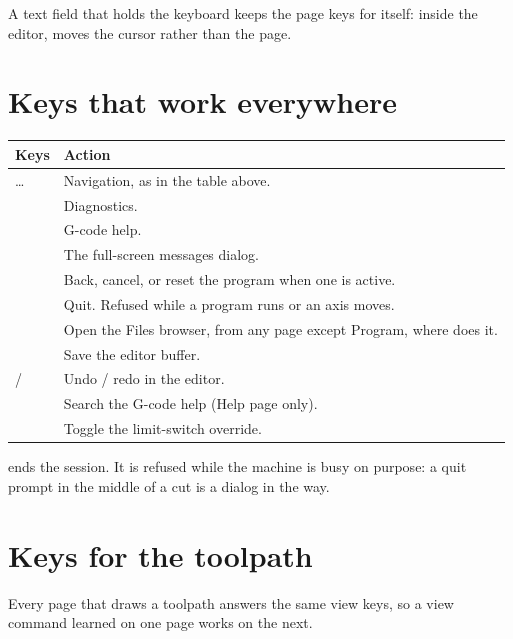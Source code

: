 A text field that holds the keyboard keeps the page keys for itself: inside the editor,
 moves the cursor rather than the page.

\section{Keys that work everywhere}

\begin{longtable}{L{4.7cm}L{8.1cm}}
  \toprule
  \textbf{Keys} & \textbf{Action} \\
  \midrule
  \endhead
   \dots {} & Navigation, as in the table above. \\
   & Diagnostics. \\
   & G-code help. \\
   & The full-screen messages dialog. \\
   & Back, cancel, or reset the program when one is active. \\
   & Quit. Refused while a program runs or an axis moves. \\
   & Open the Files browser, from any page except Program, where
         does it. \\
   & Save the editor buffer. \\
   /  & Undo / redo in the editor. \\
   & Search the G-code help (Help page only). \\
   & Toggle the limit-switch override. \\
  \bottomrule
\end{longtable}

\begin{cautionbox}
   ends the session. It is refused while the machine is busy on
  purpose: a quit prompt in the middle of a cut is a dialog in the way.
\end{cautionbox}

\section{Keys for the toolpath}

Every page that draws a toolpath answers the same view keys, so a view command learned on
one page works on the next.

